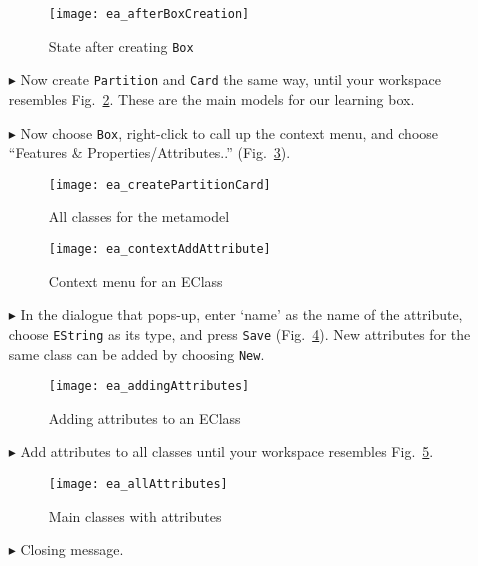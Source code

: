\begin{itemize}
\begin{figure}[htbp]
	\centering
  \texttt{[image: ea\_afterBoxCreation]}
	\caption{State after creating \texttt{Box}}
	\label{fig:eclass_completed}
\end{figure}

\item[$\blacktriangleright$] Now create \texttt{Partition} and \texttt{Card} the same way, until your workspace resembles Fig.~\ref{fig:all_eclasses}.
These are the main models for our learning box.

\vspace{0.5cm}

\item[$\blacktriangleright$] Now choose \texttt{Box}, right-click to call up the context menu, and choose ``Features \& Properties/Attributes..''
(Fig.~\ref{fig:attribute}).

\begin{figure}[htbp]
	\centering
  \texttt{[image: ea\_createPartitionCard]}
	\caption{All classes for the metamodel}
	\label{fig:all_eclasses}
\end{figure}

\begin{figure}[htbp]
	\centering
  \texttt{[image: ea\_contextAddAttribute]}
	\caption{Context menu for an EClass}
	\label{fig:attribute}
\end{figure}
\FloatBarrier

\item[$\blacktriangleright$] In the dialogue that pops-up, enter `name' as the name of the attribute, choose \texttt{EString} as its type, and press
\texttt{Save} (Fig.~\ref{fig:attribute_properties}). New attributes for the same class can be added by choosing \texttt{New}.

\begin{figure}[htbp]
	\centering
  \texttt{[image: ea\_addingAttributes]}
	\caption{Adding attributes to an EClass}
	\label{fig:attribute_properties}
\end{figure}

\item[$\blacktriangleright$] Add attributes to all classes until your workspace resembles Fig.~\ref{fig:attribute_completed}.

\begin{figure}[htbp]
	\centering
  \texttt{[image: ea\_allAttributes]}
	\caption{Main classes with attributes}
	\label{fig:attribute_completed}
\end{figure}
\FloatBarrier

\item[$\blacktriangleright$] Closing message.


\end{itemize}
